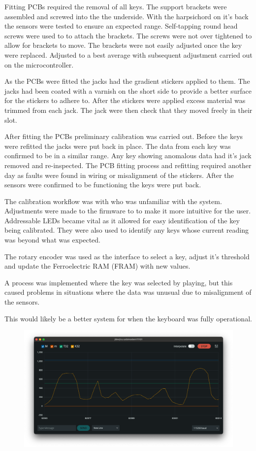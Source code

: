 Fitting PCBs required the removal of all keys. The support brackets were
assembled and screwed into the the underside. With the harpsichord on
it's back the sensors were tested to ensure an expected range.
Self-tapping round head screws were used to to attach the brackets. The
screws were not over tightened to allow for brackets to move. The
brackets were not easily adjusted once the key were replaced. Adjusted
to a best average with subsequent adjustment carried out on the
microcontroller.

As the PCBs were fitted the jacks had the gradient stickers applied to
them. The jacks had been coated with a varnish on the short side to
provide a better surface for the stickers to adhere to. After the
stickers were applied excess material was trimmed from each jack. The
jack were then check that they moved freely in their slot.

After fitting the PCBs preliminary calibration was carried out. Before
the keys were refitted the jacks were put back in place. The data from
each key was confirmed to be in a similar range. Any key showing
anomalous data had it's jack removed and re-inspected. The PCB fitting
process and refitting required another day as faults were found in
wiring or misalignment of the stickers. After the sensors were
confirmed to be functioning the keys were put back.

The calibration workflow was with  who was unfamiliar with
the system. Adjustments were made to the firmware to to make it more
intuitive for the user. Addressable LEDs became vital as it allowed for
easy identification of the key being calibrated. They were also used to
identify any keys whose current reading was beyond what was expected.

The rotary encoder was used as the interface to select a key, adjust
it's threshold and update the Ferroelectric RAM (FRAM) with new values.

A process was implemented where the key was selected by playing, but
this caused problems in situations where the data was unusual due to
misalignment of the sensors.

This would likely be a better system for when the keyboard was fully
operational.

\begin{figure}  
  \centering
  \includegraphics[width=\linewidth]{images/serial_monitor.png} 
  \caption{} 
  \Description{} 
  \label{fig:serial_monitor}
\end{figure}

